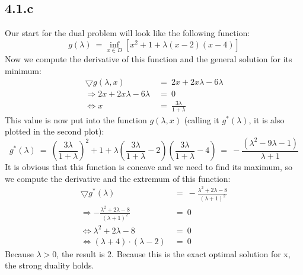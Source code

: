 \documentclass{report}
\begin{document}
	\subsection*{4.1.c}
	    Our start for the dual problem will look like the following function:
	    \[
	        g(\lambda) \ = \inf_{x \in D} [x^2 + 1 + \lambda (x-2)(x-4)]
	    \]
	    Now we compute the derivative of this function and the general solution for its minimum:
	    \begin{align*}
	        \bigtriangledown g( \lambda,x ) \ & = \ 2x + 2x\lambda - 6\lambda \\
	        \Rightarrow 2x + 2x\lambda - 6\lambda \ & = \ 0 \\
	        \Leftrightarrow x \ & = \ \frac{3\lambda}{1+\lambda}
	    \end{align*}
	    This value is now put into the function $g(\lambda, x)$ (calling it $g^*(\lambda)$, it is also plotted in the second plot):
	    \[
	        g^*(\lambda) \ = \ (\frac{3\lambda}{1+\lambda})^2 + 1 + \lambda (\frac{3\lambda}{1+\lambda} -2)(\frac{3\lambda}{1+\lambda} -4) \ = \ -\frac{(\lambda^2-9\lambda-1)}{\lambda+1}
	    \]
	    It is obvious that this function is concave and we need to find its maximum, so we compute the derivative and the extremum of this function:
	    \begin{align*}
	        \bigtriangledown g^*(\lambda) \ & = \ -\frac{\lambda ^2 + 2\lambda -8}{(\lambda +1)^2} \\
	        \Rightarrow -\frac{\lambda ^2 + 2\lambda -8}{(\lambda +1)^2} \ & = \ 0 \\
	        \Leftrightarrow \lambda ^2 + 2\lambda -8 \ & = \ 0 \\
	        \Leftrightarrow (\lambda + 4) \cdot (\lambda - 2) \ & = \ 0
	    \end{align*}
	    Because $\lambda > 0$, the result is 2. Because this is the exact optimal solution for x, the strong duality holds.
\end{document}
